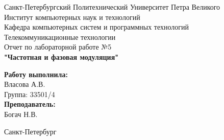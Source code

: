 \documentclass[a4paper]{article}
\begin{document}

\begin{titlepage}	%

	\begin{center}		%

		\large Санкт-Петербургский Политехнический Университет Петра Великого\\
		\large Институт компьютерных наук и технологий \\
		\large Кафедра компьютерных систем и программных технологий\\[6cm]
		
		\huge Телекоммуникационные технологии\\[0.5cm] %
		\large Отчет по лабораторной работе №5 \\[0.2cm]
		\large\textbf{"Частотная и фазовая модуляция"}\\[5cm]

	\end{center}


	\begin{flushright} %
		\begin{minipage}{0.25\textwidth} %
			\begin{flushleft} %

				\large\textbf{Работу выполнила:}\\
				\large Власова А.В.\\
				\large {Группа:} 33501/4\\
				
				\large \textbf{Преподаватель:}\\
				\large Богач Н.В.\

			\end{flushleft}
		\end{minipage}
	\end{flushright}
	
	\vfill %

	\begin{center}
	\large Санкт-Петербург\\
	\large \the\year %
	\end{center} %

\thispagestyle{empty} %
\end{titlepage} %
\end{document}
